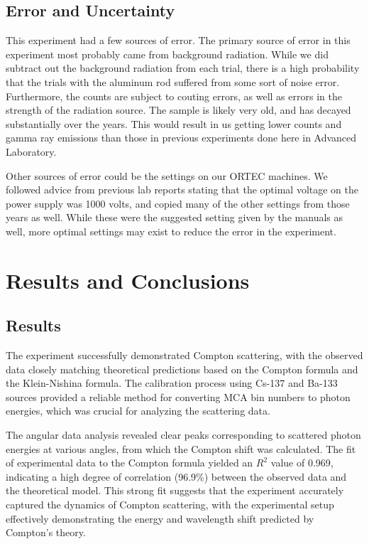 \documentclass[10pt,letterpaper,onecolumn]{article}
\begin{document}
\subsection*{Error and Uncertainty}
This experiment had a few sources of error. The primary source of error in this experiment most probably came from background radiation. While we did subtract out the background radiation from each trial, there is a high probability that the trials with the aluminum rod suffered from some sort of noise error. Furthermore, the counts are subject to couting errors, as well as errors in the strength of the radiation source. The sample is likely very old, and has decayed substantially over the years. This would result in us getting lower counts and gamma ray emissions than those in previous experiments done here in Advanced Laboratory. 

Other sources of error could be the settings on our ORTEC machines. We followed advice from previous lab reports stating that the optimal voltage on the power supply was 1000 volts, and copied many of the other settings from those years as well. While these were the suggested setting given by the manuals as well, more optimal settings may exist to reduce the error in the experiment.

\section{Results and Conclusions}
\subsection*{Results}
The experiment successfully demonstrated Compton scattering, with the observed data closely matching theoretical predictions based on the Compton formula and the Klein-Nishina formula. The calibration process using Cs-137 and Ba-133 sources provided a reliable method for converting MCA bin numbers to photon energies, which was crucial for analyzing the scattering data.

The angular data analysis revealed clear peaks corresponding to scattered photon energies at various angles, from which the Compton shift was calculated. The fit of experimental data to the Compton formula yielded an \(R^2\) value of 0.969, indicating a high degree of correlation (96.9\%) between the observed data and the theoretical model. This strong fit suggests that the experiment accurately captured the dynamics of Compton scattering, with the experimental setup effectively demonstrating the energy and wavelength shift predicted by Compton's theory.
\end{document}
